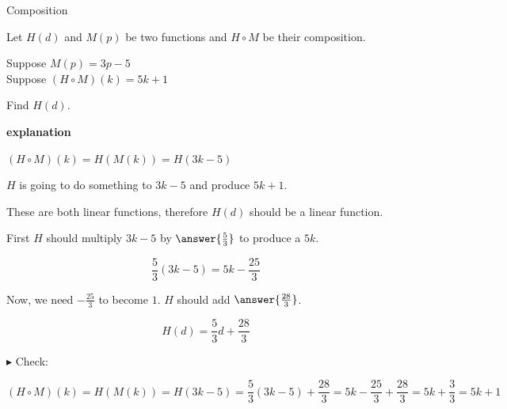 \documentclass{ximera}
\begin{document}
\begin{example} Composition


Let $H(d)$ and $M(p)$ be two functions and $H \circ M$ be their composition.


Suppose $M(p) = 3 p - 5$ \\

Suppose $(H \circ M)(k) = 5 k + 1$


Find $H(d)$.



\textbf{\textcolor{red!75!green}{explanation}} 




$(H \circ M)(k) = H(M(k)) = H(3 k - 5)$  



$H$ is going to do something to $3 k - 5$ and produce $5 k + 1$. 




These are both linear functions, therefore $H(d)$ should be a linear function.


First $H$ should multiply $3 k - 5$ by $\answer{\frac{5}{3}}$ to produce a $5k$.


\[    \frac{5}{3} (3 k - 5) = 5k - \frac{25}{3}   \]



Now, we need $-\frac{25}{3}$ to become $1$.  $H$ should add $\answer{\frac{28}{3}}$.

\[  H(d) =    \frac{5}{3} d +     \frac{28}{3} \]



$\blacktriangleright$ Check: 


\[    (H \circ M)(k) = H(M(k)) = H(3 k - 5) =    \frac{5}{3} (3 k - 5) +     \frac{28}{3}  = 5k - \frac{25}{3}  + \frac{28}{3}  = 5k + \frac{3}{3}  = 5k + 1\]






\end{example}
\end{document}
